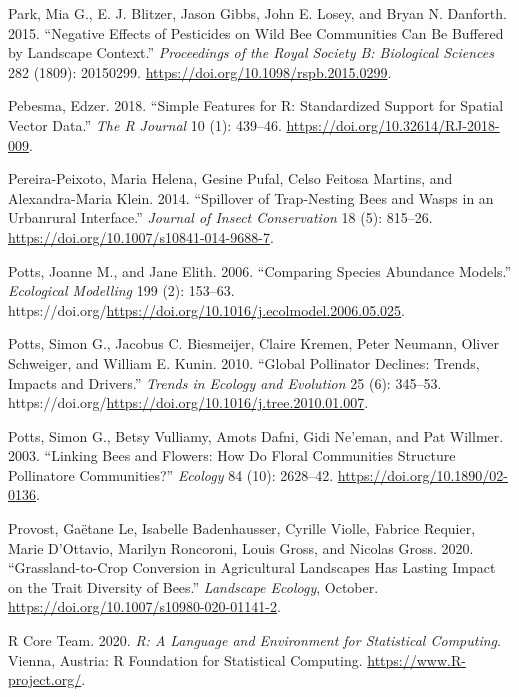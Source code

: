 \documentclass[smallextended]{svjour3}       %
\newlength{\cslhangindent}
\newenvironment{CSLReferences}[2] %
 {%
  \setlength{\parindent}{0pt}
  \ifodd #1 \everypar{\setlength{\hangindent}{\cslhangindent}}\ignorespaces\fi
  \ifnum #2 > 0
  \setlength{\parskip}{#2\baselineskip}
  \fi
 }%
 {}
\begin{document}
\begin{CSLReferences}{1}{0}
\leavevmode{}%
Park, Mia G., E. J. Blitzer, Jason Gibbs, John E. Losey, and Bryan N.
Danforth. 2015. {``Negative Effects of Pesticides on Wild Bee
Communities Can Be Buffered by Landscape Context.''} \emph{Proceedings
of the Royal Society B: Biological Sciences} 282 (1809): 20150299.
\url{https://doi.org/10.1098/rspb.2015.0299}.

\leavevmode{}%
Pebesma, Edzer. 2018. {``{Simple Features for R: Standardized Support
for Spatial Vector Data}.''} \emph{{The R Journal}} 10 (1): 439--46.
\url{https://doi.org/10.32614/RJ-2018-009}.

\leavevmode{}%
Pereira-Peixoto, Maria Helena, Gesine Pufal, Celso Feitosa Martins, and
Alexandra-Maria Klein. 2014. {``Spillover of Trap-Nesting Bees and Wasps
in an Urban{\textendash}rural Interface.''} \emph{Journal of Insect
Conservation} 18 (5): 815--26.
\url{https://doi.org/10.1007/s10841-014-9688-7}.

\leavevmode{}%
Potts, Joanne M., and Jane Elith. 2006. {``Comparing Species Abundance
Models.''} \emph{Ecological Modelling} 199 (2): 153--63.
https://doi.org/\url{https://doi.org/10.1016/j.ecolmodel.2006.05.025}.

\leavevmode{}%
Potts, Simon G., Jacobus C. Biesmeijer, Claire Kremen, Peter Neumann,
Oliver Schweiger, and William E. Kunin. 2010. {``Global Pollinator
Declines: Trends, Impacts and Drivers.''} \emph{Trends in Ecology and
Evolution} 25 (6): 345--53.
https://doi.org/\url{https://doi.org/10.1016/j.tree.2010.01.007}.

\leavevmode{}%
Potts, Simon G., Betsy Vulliamy, Amots Dafni, Gidi Ne'eman, and Pat
Willmer. 2003. {``Linking Bees and Flowers: How Do Floral Communities
Structure Pollinatore Communities?''} \emph{Ecology} 84 (10): 2628--42.
\url{https://doi.org/10.1890/02-0136}.

\leavevmode{}%
Provost, Gaëtane Le, Isabelle Badenhausser, Cyrille Violle, Fabrice
Requier, Marie D'Ottavio, Marilyn Roncoroni, Louis Gross, and Nicolas
Gross. 2020. {``Grassland-to-Crop Conversion in Agricultural Landscapes
Has Lasting Impact on the Trait Diversity of Bees.''} \emph{Landscape
Ecology}, October. \url{https://doi.org/10.1007/s10980-020-01141-2}.

\leavevmode{}%
R Core Team. 2020. \emph{R: A Language and Environment for Statistical
Computing}. Vienna, Austria: R Foundation for Statistical Computing.
\url{https://www.R-project.org/}.


\end{CSLReferences}
\end{document}
